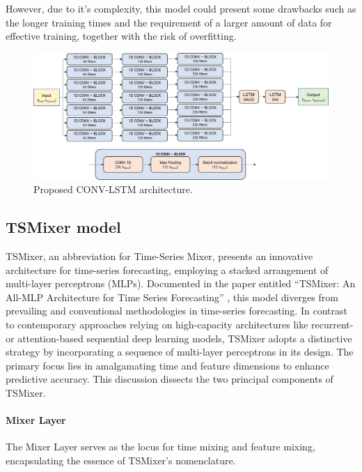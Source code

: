 However, due to it's complexity, this model could present some drawbacks such as the longer training times and the requirement of a larger amount of data for effective training, together with the risk of overfitting.


\begin{figure}
    \centering
    \includegraphics[width=1\linewidth]{images/model architectures/convlstm_model.png}
    \caption{Proposed CONV-LSTM architecture.}
    \label{fig:convlstm_model}
\end{figure}

\subsection{TSMixer model}

TSMixer, an abbreviation for Time-Series Mixer, presents an innovative architecture for time-series forecasting, employing a stacked arrangement of multi-layer perceptrons (MLPs). Documented in the paper entitled ``TSMixer: An All-MLP Architecture for Time Series Forecasting'' \cite{chen2023tsmixer}, this model diverges from prevailing and conventional methodologies in time-series forecasting. In contrast to contemporary approaches relying on high-capacity architectures like recurrent- or attention-based sequential deep learning models, TSMixer adopts a distinctive strategy by incorporating a sequence of multi-layer perceptrons in its design. The primary focus lies in amalgamating time and feature dimensions to enhance predictive accuracy. This discussion dissects the two principal components of TSMixer.

\paragraph{Mixer Layer}

The Mixer Layer serves as the locus for time mixing and feature mixing, encapsulating the essence of TSMixer's nomenclature.

